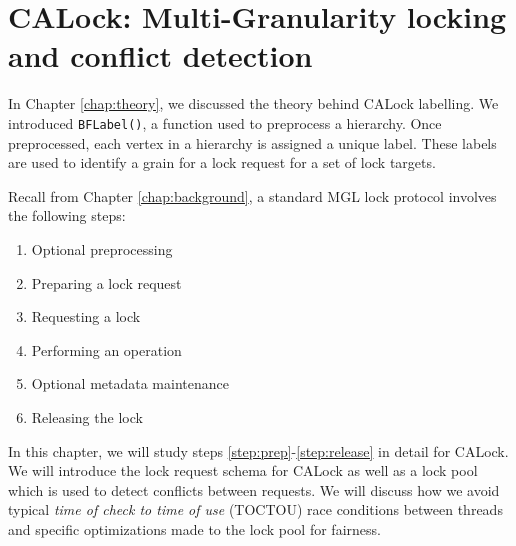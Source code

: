 
\chapter{CALock: Multi-Granularity locking and conflict detection} \label{chap:calock}

\minitoc

In Chapter \ref{chap:theory}, we discussed the theory behind CALock labelling. We introduced \lstinline|BFLabel()|, a function used to preprocess a hierarchy. Once preprocessed, each vertex in a hierarchy is assigned a unique label. These labels are used to identify a grain for a lock request for a set of lock targets. 


Recall from Chapter \ref{chap:background}, a standard MGL lock protocol involves the following steps:

\begin{enumerate}
	\item Optional preprocessing
	\item Preparing a lock request \label{step:prep}
	\item Requesting a lock
	\item Performing an operation
	\item Optional metadata maintenance
	\item Releasing the lock \label{step:release}
\end{enumerate}

In this chapter, we will study steps \ref{step:prep}-\ref{step:release} in detail for CALock. We will introduce the lock request schema for CALock as well as a lock pool which is used to detect conflicts between requests. We will discuss how we avoid typical \emph{time of check to time of use} (TOCTOU) race conditions between threads and specific optimizations made to the lock pool for fairness.


